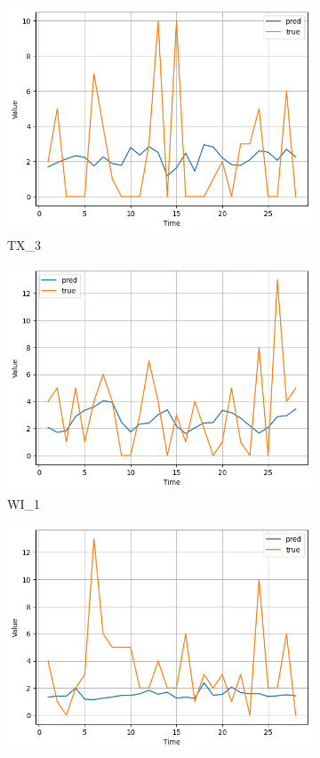 \documentclass[12pt]{article}
\begin{document}
\begin{figure}[H]
\begin{subfigure}[b]{0.2\textwidth}
        \includegraphics[width=\textwidth]{image/output5.png}
        \caption{TX\_3}
        \label{fig:output5}
    \end{subfigure}
    \begin{subfigure}[b]{0.2\textwidth}
        \includegraphics[width=\textwidth]{image/output6.png}
        \caption{WI\_1}
        \label{fig:output6}
    \end{subfigure}
    \begin{subfigure}[b]{0.2\textwidth}
        \includegraphics[width=\textwidth]{image/output7.png}

\end{subfigure}
\end{figure}
\end{document}
